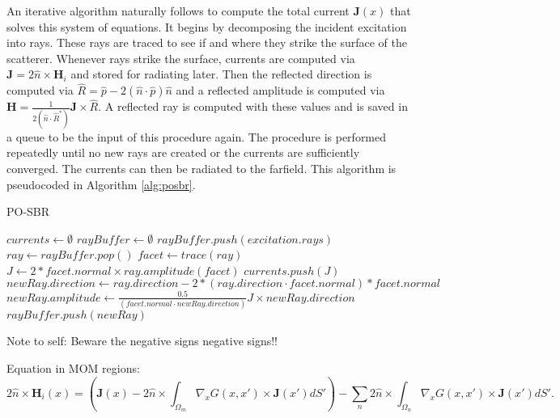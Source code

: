 \documentclass{article}
\theoremstyle{plain}
\begin{document}
An iterative algorithm naturally follows to compute the total current $\mathbf{J}(x)$ that solves this system of equations.
It begins by decomposing the incident excitation into rays.
These rays are traced to see if and where they strike the surface of the scatterer.
Whenever rays strike the surface, currents are computed via $\mathbf{J}=2\hat{n}\times \mathbf{H}_i$
and stored for radiating later.
Then the reflected direction is computed via $\hat{R} = \hat{p} - 2(\hat{n}\cdot\hat{p})\hat{n}$
and a reflected amplitude is computed via $\mathbf{H} = \frac{1}{2\left(\hat{n}\cdot\hat{R}^*\right)}\mathbf{J} \times \hat{R}$.
A reflected ray is computed with these values and is saved in a queue to be the input of this procedure again.
The procedure is performed repeatedly until no new rays are created or the currents are sufficiently converged.
The currents can then be radiated to the farfield. This algorithm is pseudocoded in Algorithm \ref{alg:posbr}.
\begin{algorithm}
\caption{PO-SBR}\label{alg:posbr}
\begin{algorithmic}[1]
\State $currents \gets \emptyset$
\State $rayBuffer \gets \emptyset$
\State $rayBuffer.push( excitation.rays )$
\State $ray \gets rayBuffer.pop()$
\State $facet \gets trace(ray)$
    \State $J \gets 2*facet.normal \times ray.amplitude(facet)$
    \State $currents.push(J)$
    \State $newRay.direction \gets ray.direction - 2*(ray.direction \cdot facet.normal)*facet.normal$
    \State $newRay.amplitude \gets \frac{0.5}{\left(facet.normal\cdot newRay.direction\right)} J \times newRay.direction$
    \State $rayBuffer.push( newRay )$
\EndIf
\EndWhile
\end{algorithmic}
\end{algorithm}


Note to self: Beware the negative signs negative signs!!

Equation in MOM regions:
\begin{equation}
	2\hat{n}\times\mathbf{H}_i(x)
	= \left( \mathbf{J}(x)
	- 2\hat{n}\times\int_{\Omega_m} \nabla_{x} G(x,x') \times \mathbf{J}(x') dS'\right)
	- \sum_n 2\hat{n}\times\int_{\Omega_n} \nabla_{x} G(x,x') \times \mathbf{J}(x') dS'.
\end{equation}
\end{document}
